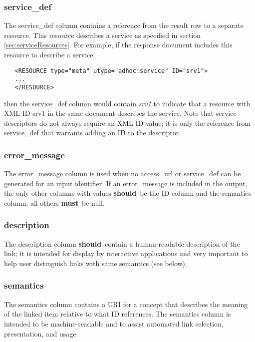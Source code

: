 \documentclass[11pt,a4paper]{ivoa}
\newcommand{\rfcmust}{\textbf{must}}
\newcommand{\rfcshould}{\textbf{should}}
\begin{document}
\subsubsection{service\_def}

The service\_def column contains a reference from the result row to
a separate resource. This resource describes a service as specified
in section \ref{sec:serviceResources}.
For example, if the response document includes this resource
to describe a service:
\begin{verbatim}
   <RESOURCE type="meta" utype="adhoc:service" ID="srv1">
   ...
   </RESOURCE>
\end{verbatim}
then the service\_def column would contain {\em srv1\/} to indicate that
a resource with XML ID srv1 in the same document describes the service.
Note that service descriptors do not always require an XML ID value;
it is only the reference from service\_def that warrants adding
an ID to the descriptor.


\subsubsection{error\_message}

The error\_message column is used when no access\_url or service\_def can be generated for
an input identifier. If an error\_message is included in the output, the
only other columns with values \rfcshould\ be the ID column and the semantics
column; all others \rfcmust\ be null.


\subsubsection{description}

The description column \rfcshould\ contain a human-readable description of
the link; it is intended for display by interactive applications and very
important to help user distinguish links with same semantics (see below).


\subsubsection{semantics}
\label{sect:semantics}

The semantics column contains a URI for a concept
that describes the meaning of the linked item relative
to what ID references. The semantics column is intended to be
machine-readable and to assist automated link selection, presentation, and
usage.
\end{document}
